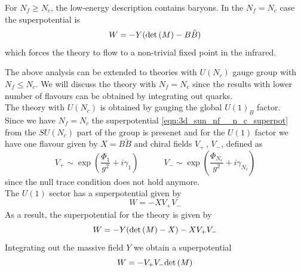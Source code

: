 For $N_f \geq N_c $, the low-energy description contains baryons.
In the $N_f = N_c$ case the superpotential is 
\begin{equation}
W = - Y ( \mathrm{det } \,{(M)} - B \tilde{B})
\label{eqn:3d_sun_nf__n_c_superpot}
\end{equation}
which forces the theory to flow to a non-trivial fixed point in the infrared.

The above analysis can be extended to theories with $U(N_c)$ gauge group with $N_f \leq N_c$.
We will discuss the theory with $N_f = N_c$ since the results with lower number of flavours can be obtained by integrating out quarks.\\
The theory with $U(N_c)$ is obtained by gauging the global $U(1)_B$ factor.\\
Since we have $N_f=N_c$ the superpotential \eqref{eqn:3d_sun_nf__n_c_superpot} from the $SU(N_c)$ part of the group is presenet  and for the $U(1)$ factor we have one flavour given by $X = B \tilde{B}$ 
and chiral fields $V_+ \, , \,V_-$, defined as 
\begin{equation}
V_+ \sim \exp{ \left(  \frac{\Phi_1}{g^2} + i \gamma_1 \right) } \qquad \quad V_- \sim \exp{ \left( \frac{\Phi_{N_c}}{g^2} + i \gamma_{N_c} \right) }
\end{equation}
since the null trace condition does not hold anymore.\\
 The $U(1)$ sector has a superpotential given by
 $$ W = - X V_+ V_-$$
As a result, the superpotential for the theory is given by
\begin{equation}
 W = - Y ( \mathrm{det } \,{(M)}  - X) - X V_+ V_- 
 \end{equation} 
Integrating out the massive field $Y$  we obtain a superpotential
\begin{equation}
W = -  V_+ V_-  \mathrm{det } \,{(M)}
\label{eqn:aharony_dual_description_NcNf}
\end{equation}



